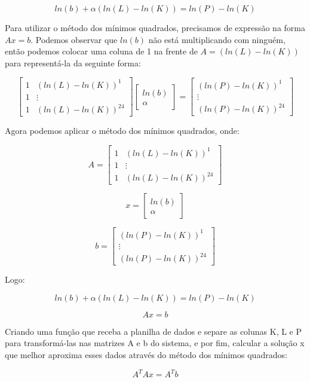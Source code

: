 \documentclass[leqno]{article}
\numberwithin{equation}{section}
\begin{document}
\begin{enumerate}
		$$ln(b) + \alpha (ln(L) - ln(K)) = ln(𝑃) - ln(K)$$
		
		Para utilizar o método dos mínimos quadrados, precisamos de expressão na forma $Ax = b$.
		Podemos observar que $ln(b)$ não está multiplicando com ninguém, então podemos colocar uma coluna de 1 na frente de $A = (ln(L) - ln(K))$ para representá-la da seguinte forma:
		
		
		$$\begin{bmatrix}
			1 & (ln(L) - ln(K))^1 \\
			1 & \vdots \\
			1 & (ln(L) - ln(K))^{24}
		\end{bmatrix}
		\begin{bmatrix}
			ln(b) \\
			\alpha
		\end{bmatrix} = \begin{bmatrix}
			(ln(P) - ln(K))^1 \\
			\vdots \\
			(ln(P) - ln(K))^{24}
		\end{bmatrix}$$
	
	Agora podemos aplicar o método dos mínimos quadrados, onde:
	
	$$A = \begin{bmatrix}
		1 & (ln(L) - ln(K))^1 \\
		1 & \vdots \\
		1 & (ln(L) - ln(K))^{24}
	\end{bmatrix}$$

	$$x = \begin{bmatrix}
		ln(b) \\
		\alpha
	\end{bmatrix}$$

	$$b = \begin{bmatrix}
		(ln(P) - ln(K))^1 \\
		\vdots \\
		(ln(P) - ln(K))^{24}
	\end{bmatrix}$$

	Logo:
	
		$$ln(b) + \alpha (ln(L) - ln(K)) = ln(𝑃) - ln(K)$$
		
		$$Ax = b$$
		
	Criando uma função que receba a planilha de dados e separe as colunas K, L e P para transformá-las nas matrizes A e b do sistema, e por fim, calcular a solução x que melhor aproxima esses dados através do método dos mínimos quadrados:
	
	$$A^TAx = A^Tb$$
	

\end{enumerate}
\end{document}

